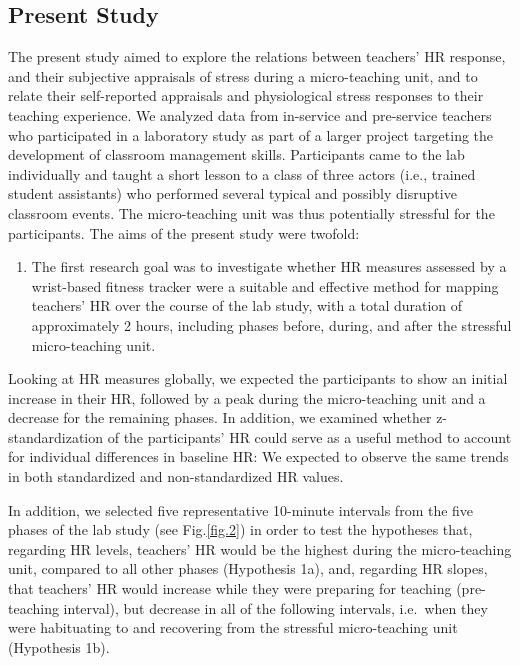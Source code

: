 \documentclass[preprint,
3p]{elsarticle} %
\providecommand{\tightlist}{%
  \setlength{\itemsep}{0pt}\setlength{\parskip}{0pt}}
\begin{document}
\subsection{Present Study}\label{present-study}

The present study aimed to explore the relations between teachers' HR
response, and their subjective appraisals of stress during a
micro-teaching unit, and to relate their self-reported appraisals and
physiological stress responses to their teaching experience. We analyzed
data from in-service and pre-service teachers who participated in a
laboratory study as part of a larger project targeting the development
of classroom management skills. Participants came to the lab
individually and taught a short lesson to a class of three actors (i.e.,
trained student assistants) who performed several typical and possibly
disruptive classroom events. The micro-teaching unit was thus
potentially stressful for the participants. The aims of the present
study were twofold:

\begin{enumerate}
\def\labelenumi{(\arabic{enumi})}
\tightlist
\item
  The first research goal was to investigate whether HR measures
  assessed by a wrist-based fitness tracker were a suitable and
  effective method for mapping teachers' HR over the course of the lab
  study, with a total duration of approximately 2 hours, including
  phases before, during, and after the stressful micro-teaching unit.
\end{enumerate}

Looking at HR measures globally, we expected the participants to show an
initial increase in their HR, followed by a peak during the
micro-teaching unit and a decrease for the remaining phases. In
addition, we examined whether z-standardization of the participants' HR
could serve as a useful method to account for individual differences in
baseline HR: We expected to observe the same trends in both standardized
and non-standardized HR values.

In addition, we selected five representative 10-minute intervals from
the five phases of the lab study (see Fig.\ref{fig.2}) in order to test
the hypotheses that, regarding HR levels, teachers' HR would be the
highest during the micro-teaching unit, compared to all other phases
(Hypothesis 1a), and, regarding HR slopes, that teachers' HR would
increase while they were preparing for teaching (pre-teaching interval),
but decrease in all of the following intervals, i.e.~when they were
habituating to and recovering from the stressful micro-teaching unit
(Hypothesis 1b).
\end{document}
